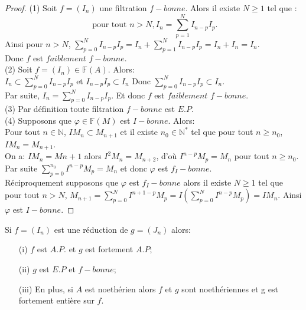 \begin{proof}
	(1) Soit $f=(I_n)$ une filtration $f-bonne$. Alors il existe $N \geqslant 1$ tel que :
	\[ \text{ pour tout } n > N, I_n = \sum\limits_{p=1}^{N} I_{n-p}I_p. \]
	Ainsi pour $n> N$, $\sum\limits_{p=0}^{N} I_{n-p}I_p =  I_n + \sum\limits_{p=1}^{N} I_{n-p}I_p = I_n + I_n = I_n$. \\
	Donc $f$ est $faiblement$ $f-bonne$. \\
	(2) Soit $f=(I_n) \in \mathbb{F}(A)$. Alors:\\
	$I_n \subset \sum\limits_{p=0}^{N} I_{n-p}I_p$ et $ I_{n-p}I_p \subset I_n$
	Donc $\sum\limits_{p=0}^{N}I_{n-p}I_p \subset I_n$. \\ Par suite, $I_n = \sum\limits_{p=0}^{N} I_{n-p}I_p.$ Et donc $f$ est $faiblement$ $f-bonne$.\\
	(3) Par définition toute filtration $f-bonne$ est $E.P$.\\
	(4) Supposons que $\varphi \in \mathbb{F}(M)$ est $I-bonne$. Alors: \\
	Pour tout $n \in \mathbb{N}$, $IM_n \subset M_{n+1}$ et il existe $n_0 \in \mathbb{N}^{*}$ tel que pour tout $n \geqslant n_0$, $IM_n = M_{n+1}$.\\
	On a: $IM_n=M{n+1}$ alors $I^{2}M_n=M_{n+2}$, d'où $I^{n-p}M_p=M_n$ pour tout $n \geqslant n_0$.\\ Par suite $\sum\limits_{p=0}^{n_0}I^{n-p}M_p=M_n$ et donc $\varphi$ est $f_{I}-bonne$.\\
	Réciproquement supposons que $\varphi$ est $f_{I}-bonne$ alors il existe $N \geqslant 1$ tel que pour tout $n> N$, $M_{n+1} = \sum\limits_{p=0}^{N}I^{n+1-p}M_p =I(\sum\limits_{p=0}^{N}I^{n-p}M_p ) = IM_n$. Ainsi $\varphi$ est $I-bonne$.	
	
\end{proof}
\begin{maproposition}
	\label{maprop7}
	Si $f=(I_n)$ est une réduction de $g=(J_n)$ alors:
	\begin{enumerate}
		\item[(i)] $f$ est $A.P.$ et $g$ est fortement $A.P$;
		\item[(ii)] $g$ est $E.P$ et $f-bonne$;
		\item[(iii)] En plus, si $A$ est noethérien alors $f$ et $g$ sont noethériennes et g est fortement entière sur $f$.
	\end{enumerate}
\end{maproposition}
